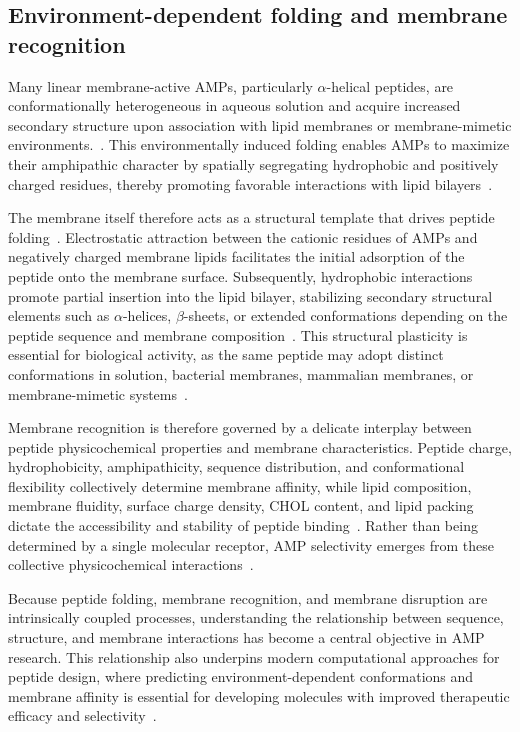 \subsection{Environment-dependent folding and membrane recognition}

Many linear membrane-active AMPs, particularly $\alpha$-helical peptides, are conformationally heterogeneous in aqueous solution and acquire increased secondary structure upon association with lipid membranes or membrane-mimetic environments.~\cite{Li2021}. This environmentally induced folding enables AMPs to maximize their amphipathic character by spatially segregating hydrophobic and positively charged residues, thereby promoting favorable interactions with lipid bilayers~\cite{torres2019peptide}.

The membrane itself therefore acts as a structural template that drives peptide folding~\cite{experiments_2}. Electrostatic attraction between the cationic residues of AMPs and negatively charged membrane lipids facilitates the initial adsorption of the peptide onto the membrane surface. Subsequently, hydrophobic interactions promote partial insertion into the lipid bilayer, stabilizing secondary structural elements such as $\alpha$-helices, $\beta$-sheets, or extended conformations depending on the peptide sequence and membrane composition~\cite{Li2021}. This structural plasticity is essential for biological activity, as the same peptide may adopt distinct conformations in solution, bacterial membranes, mammalian membranes, or membrane-mimetic systems~\cite{torres2019peptide}.

Membrane recognition is therefore governed by a delicate interplay between peptide physicochemical properties and membrane characteristics. Peptide charge, hydrophobicity, amphipathicity, sequence distribution, and conformational flexibility collectively determine membrane affinity, while lipid composition, membrane fluidity, surface charge density, CHOL content, and lipid packing dictate the accessibility and stability of peptide binding~\cite{Yeaman2003,Huan2020}. Rather than being determined by a single molecular receptor, AMP selectivity emerges from these collective physicochemical interactions~\cite{Zasloff2002}.

Because peptide folding, membrane recognition, and membrane disruption are intrinsically coupled processes, understanding the relationship between sequence, structure, and membrane interactions has become a central objective in AMP research. This relationship also underpins modern computational approaches for peptide design, where predicting environment-dependent conformations and membrane affinity is essential for developing molecules with improved therapeutic efficacy and selectivity~\cite{Deb2026}.



